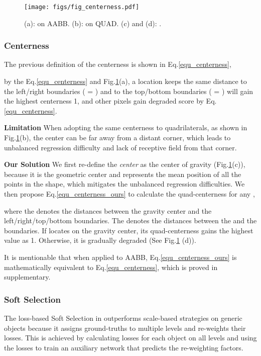 \documentclass[runningheads]{llncs}
\begin{document}
\begin{figure}[t]
    \centering
    \texttt{[image: figs/fig\_centerness.pdf]}
    \caption{(a):  on AABB. (b):  on QUAD. (c) and (d): .}
    \label{fig:centerness}
\end{figure}

\subsubsection{Centerness}
The previous definition of the centerness \cite{tian2019fcos,zhu2020soft} is shown in Eq.\ref{equ_centerness},



\noindent by the Eq.\ref{equ_centerness} and Fig.\ref{fig:centerness}(a), a location  keeps the same distance to the left/right boundaries ( = ) and to the top/bottom boundaries ( = ) will gain the highest centerness 1, and other pixels gain degraded score by Eq.\ref{equ_centerness}. 

\textbf{Limitation} When adopting the same centerness to quadrilaterals, as shown in Fig.\ref{fig:centerness}(b), the center can be far away from a distant corner, which leads to unbalanced regression difficulty and lack of receptive field from that corner. 

\textbf{Our Solution} We first re-define the \textit{center} as the center of gravity (Fig.\ref{fig:centerness}(c)), because it is the geometric center and represents the mean position of all the points in the shape, which mitigates the unbalanced regression difficulties. We then propose Eq.\ref{equ_centerness_ours} to calculate the quad-centerness for any ,



\noindent where the  denotes the distances between the gravity center  and the left/right/top/bottom boundaries. The  denotes the distances between the  and the boundaries. If  locates on the gravity center, its quad-centerness gains the highest value as 1. Otherwise, it is gradually degraded (See Fig.\ref{fig:centerness} (d)). 

It is mentionable that when applied to AABB, Eq.\ref{equ_centerness_ours} is mathematically equivalent to Eq.\ref{equ_centerness}, which is proved in supplementary.

\subsubsection{Soft Selection}
The loss-based Soft Selection in \cite{zhu2020soft} outperforms scale-based strategies on generic objects because it assigns ground-truths to multiple levels and re-weights their losses. This is achieved by calculating losses for each object on all levels and using the losses to train an auxiliary network that predicts the re-weighting factors. 
\end{document}
